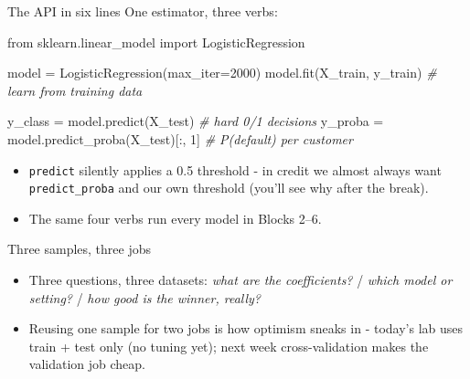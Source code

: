 \documentclass[10pt,aspectratio=169]{beamer}
\begin{document}
\begin{frame}[fragile]{The API in six lines}
\small One estimator, three verbs:
{\footnotesize
\begin{semiverbatim}
from sklearn.linear_model import LogisticRegression

model = LogisticRegression(max_iter=2000)
model.fit(X_train, y_train)              \textit{\# learn from training data}

y_class = model.predict(X_test)          \textit{\# hard 0/1 decisions}
y_proba = model.predict_proba(X_test)[:, 1]  \textit{\# P(default) per customer}
\end{semiverbatim}}
  \vspace{0.4em}
  \begin{itemize}\small
    \item \texttt{predict} silently applies a 0.5 threshold -
          in credit we almost always want \texttt{predict\_proba} and
          \alert{our own threshold} (you'll see why after the break).
    \item The same four verbs run every model in Blocks 2--6.
  \end{itemize}
\end{frame}

\begin{frame}{Three samples, three jobs}
  \begin{center}
  \end{center}
  \vspace{0.9em}
  \begin{itemize}\small
    \item Three questions, three datasets: \emph{what are the coefficients?}
          / \emph{which model or setting?} / \emph{how good is the winner,
          really?}
    \item Reusing one sample for two jobs is how optimism sneaks in -
          today's lab uses train + test only (no tuning yet); next week
          \alert{cross-validation} makes the validation job cheap.
  \end{itemize}
\end{frame}
\end{document}
